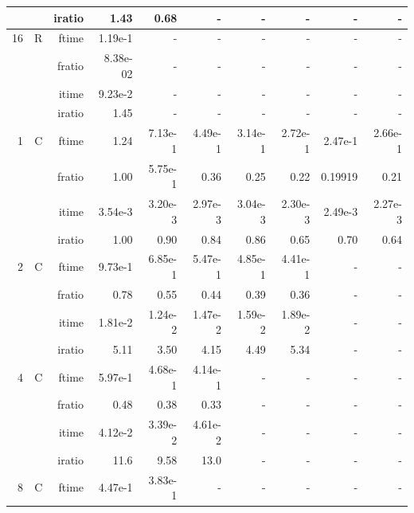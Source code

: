 \documentclass[a4paper]{article}
\begin{document}
\begin{table}[htbp]
\begin{center}
\begin{small}
\begin{tabular}{|r|r|r|r|r|r|r|r|r|r|}
             &             &  iratio &    1.43  &    0.68 &      - &      - &      - &      - &      - \\\hline
   16 &   R &   ftime &    1.19e-1 &      - &      - &      - &      - &      - &      - \\
             &             &  fratio &    8.38e-02 &     - &      - &      - &      - &      - &      - \\
             &             &  itime &    9.23e-2 &      - &      - &      - &      - &      - &      - \\
             &             &  iratio &   1.45  &      - &      - &      - &      - &      - &      - \\\hline\hline
   1 &   C &  ftime &    1.24  &    7.13e-1 &    4.49e-1 &    3.14e-1 &    2.72e-1 &    2.47e-1 &    2.66e-1 \\
             &             &  fratio &    1.00 &    5.75e-1 &    0.36 &    0.25 &   0.22 &    0.19919 &    0.21 \\
             &             &  itime &    3.54e-3 &    3.20e-3 &    2.97e-3 &    3.04e-3 &    2.30e-3 &    2.49e-3 &    2.27e-3 \\
             &             &  iratio &    1.00 &    0.90 &    0.84 &    0.86 &    0.65 &    0.70 &    0.64 \\\hline
   2 &  C &  ftime &    9.73e-1 &    6.85e-1 &    5.47e-1 &    4.85e-1 &    4.41e-1 &      - &      - \\
             &             &  fratio &    0.78 &    0.55 &    0.44 &    0.39 &    0.36 &      - &      - \\
             &             &  itime &    1.81e-2 &    1.24e-2 &    1.47e-2 &    1.59e-2 &    1.89e-2 &      - &      - \\
             &             &  iratio &    5.11  &    3.50  &    4.15  &    4.49  &    5.34  &      - &      - \\\hline
   4 &  C &  ftime &    5.97e-1 &    4.68e-1 &    4.14e-1 &      - &      - &      - &      - \\
             &             &  fratio &    0.48 &    0.38 &    0.33 &      - &      - &      - &      - \\
             &             &  itime &    4.12e-2 &    3.39e-2 &    4.61e-2 &      - &      - &      - &      - \\
             &             &  iratio &    11.6 &   9.58  &    13.0 &     - &      - &      - &      - \\\hline
   8 &   C &  ftime &    4.47e-1 &    3.83e-1 &      - &      - &      - &      - &      - \\

\end{tabular}
\end{small}
\end{center}
\end{table}
\end{document}

